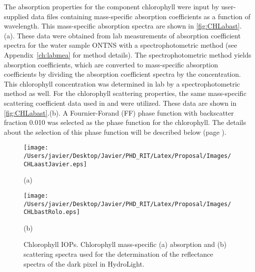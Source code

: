 The absorption properties for the component chlorophyll were input by user-supplied data files containing mass-specific absorption coefficients as a function of wavelength. This mass-specific absorption spectra are shown in \autoref{fig:CHLabast}.(a). These data were obtained from lab measurements of absorption coefficient spectra for the water sample ONTNS with a spectrophotometric method (see Appendix~\ref{ch:labmea} for method details). The spectrophotometric method yields absorption coefficients, which are converted to mass-specific absorption coefficients by dividing the absorption coefficient spectra by the concentration. This chlorophyll concentration was determined in lab by a spectrophotometric method as well. For the chlorophyll scattering properties, the same mass-specific scattering coefficient data used in \cite{Raqueno:2000} and \cite{Raqueno:2003} were utilized. These data are shown in \autoref{fig:CHLabast}.(b). A Fournier-Forand (FF) phase function with backscatter fraction 0.010 was selected as the phase function for the chlorophyll. The details about the selection of this phase function will be described below (page \pageref{pag:phasefn}).
\begin{figure}[htb]
  \begin{minipage}[c]{0.48\linewidth}
    \centering
  	\texttt{[image: /Users/javier/Desktop/Javier/PHD\_RIT/Latex/Proposal/Images/CHLaastJavier.eps]}
    \centerline{(a)}\medskip
  \end{minipage}
  \hfill
  \begin{minipage}[c]{0.48\linewidth}
    \centering
  	\texttt{[image: /Users/javier/Desktop/Javier/PHD\_RIT/Latex/Proposal/Images/CHLbastRolo.eps]}
    \centerline{(b)}\medskip
  \end{minipage}
  \caption{Chlorophyll IOPs. Chlorophyll mass-specific (a) absorption and (b) scattering spectra used for the determination of the reflectance spectra of the dark pixel in HydroLight. \label{fig:CHLabast} }   
\end{figure}

